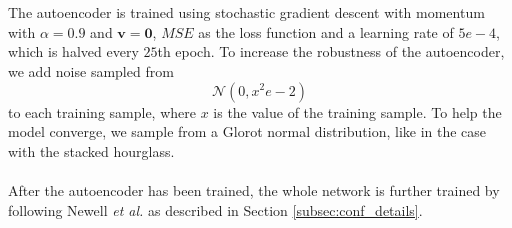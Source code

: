 \documentclass[./main.tex]{subfiles}
\begin{document}
\\
\\
The autoencoder is trained using stochastic gradient descent with momentum with $\alpha = 0.9$ and $\bm{v} = \bm{0}$, $MSE$ as the loss function and a learning rate of $5e-4$, which is halved every $25$th epoch. To increase the robustness of the autoencoder, we add noise sampled from
$$\mathcal{N} \left(0, x^2e-2 \right)$$
to each training sample, where $x$ is the value of the training sample. To help the model converge, we sample from a Glorot normal distribution, like in the case with the stacked hourglass.
\\
\\
After the autoencoder has been trained, the whole network is further trained by following Newell \textit{et al.} \cite{Newell} as described in Section \ref{subsec:conf_details}.
\end{document}
